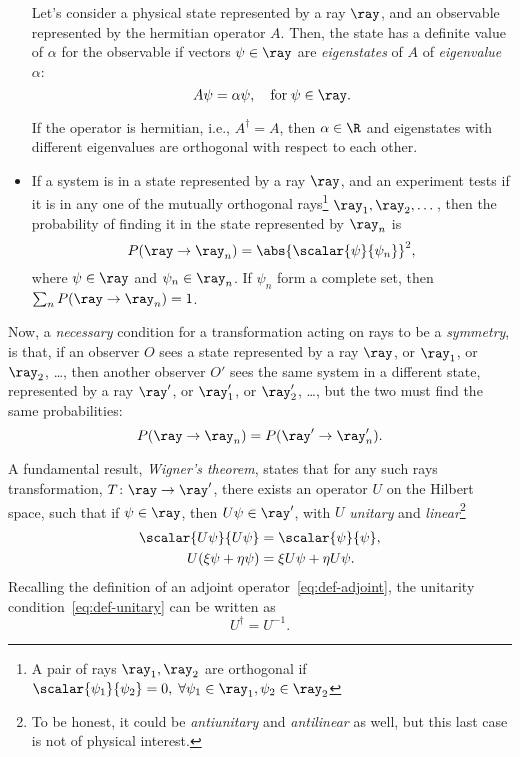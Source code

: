\begin{itemize}
    Let's consider a physical state represented by a ray $\ray$, and an observable represented by the hermitian operator $A$. Then, the state has a definite value of $\alpha$ for the observable if vectors $\psi \in \ray$ are \emph{eigenstates} of $A$ of \emph{eigenvalue} $\alpha$:
    \begin{equation}
        A\psi = \alpha \psi, \quad \textup{for} \; \psi \in \ray .
    \end{equation}

    If the operator is hermitian, i.e., $A^\dagger = A$, then $\alpha \in \R$ and eigenstates with different eigenvalues are orthogonal with respect to each other.
    \item If a system is in a state represented by a ray $\ray$, and an experiment tests if it is in any one of the  mutually orthogonal rays\footnote{A pair of rays $\ray_1, \ray_2$ are orthogonal if $\scalar{\psi_1}{\psi_2} = 0, \; \forall \psi_1 \in \ray_1,  \psi_2 \in \ray_2$} $\ray_1, \ray_2, \dots$, then the probability of finding it in the state represented by $\ray_n$ is 
    \begin{equation}
        P(\ray \to \ray_n) = \abs{\scalar{\psi}{\psi_n}}^2 ,
    \end{equation}
    where $\psi \in \ray$ and $\psi_n \in \ray_n$. If $\psi_n$ form a complete set, then $\sum_n P(\ray \to \ray_n) = 1$.
\end{itemize}

Now, a \emph{necessary} condition for a transformation acting on rays to be a \emph{symmetry}, is that, if an observer $O$ sees a state represented by a ray $\ray$, or $\ray_1$, or $\ray_2$, \dots, then another observer $O'$ sees the same system in a different state, represented by a ray $\ray'$, or $\ray'_1$, or $\ray'_2$, \dots, but the two must find the same probabilities:
\begin{equation}
    P(\ray \to \ray_n) = P(\ray' \to \ray'_n) .
\end{equation}

A fundamental result, \emph{Wigner's theorem}, states that for any such rays transformation, $T \colon \ray \to \ray'$, there exists an operator $U$ on the Hilbert space, such that if $\psi \in \ray$, then $U\psi \in \ray'$, with $U$ \emph{unitary} and \emph{linear}\footnote{To be honest, it could be \emph{antiunitary} and \emph{antilinear} as well, but this last case is not of physical interest.}
\begin{subequations}
\begin{align}
    \scalar{U\psi}{U\psi} &= \scalar{\psi}{\psi} \label{eq:def-unitary} ,\\ 
    U(\xi \psi + \eta \psi) &= \xi U \psi + \eta U \psi .
\end{align}
\end{subequations}
Recalling the definition of an adjoint operator~\eqref{eq:def-adjoint}, the unitarity condition~\eqref{eq:def-unitary} can be written as
\begin{equation}
    U^\dagger = U^{-1} .
\end{equation}

